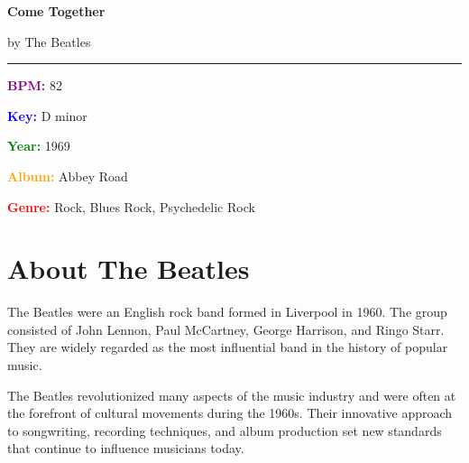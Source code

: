 \documentclass[11pt,letterpaper]{article}
\newcommand{\purple}[1]{\textcolor{purple}{\textbf{#1}}}
\newcommand{\bluepurple}[1]{\textcolor{blue}{\textbf{#1}}}
\newcommand{\greentext}[1]{\textcolor{green}{\textbf{#1}}}
\newcommand{\redtext}[1]{\textcolor{red}{\textbf{#1}}}
\newcommand{\orangetext}[1]{\textcolor{orange}{\textbf{#1}}}
\newcommand{\songtitle}{Come Together}
\newcommand{\artistname}{The Beatles}
\newcommand{\songbpm}{82}
\newcommand{\songkey}{D minor}
\newcommand{\songyear}{1969}
\newcommand{\songgenre}{Rock, Blues Rock, Psychedelic Rock}
\newcommand{\songalbum}{Abbey Road}
\begin{document}
\thispagestyle{empty}

\begin{center}
{\Huge\bfseries\sffamily \songtitle}

\vspace{0.3cm}

{\LARGE by \artistname}

\vspace{0.5cm}


\vspace{0.5cm}

\rule{0.8\textwidth}{0.5pt}
\end{center}

\vspace{0.5cm}

\begin{tcolorbox}[colback=lightgray,colframe=purple,width=\textwidth,arc=3mm,boxrule=1pt]
\begin{multicols}{2}
\textbf{\purple{BPM:}} \songbpm

\textbf{\bluepurple{Key:}} \songkey

\textbf{\greentext{Year:}} \songyear

\textbf{\orangetext{Album:}} \songalbum

\textbf{\redtext{Genre:}} \songgenre
\end{multicols}
\end{tcolorbox}

\vspace{0.5cm}

\section*{About The Beatles}

The Beatles were an English rock band formed in Liverpool in 1960. The group consisted of John Lennon, Paul McCartney, George Harrison, and Ringo Starr. They are widely regarded as the most influential band in the history of popular music.

The Beatles revolutionized many aspects of the music industry and were often at the forefront of cultural movements during the 1960s. Their innovative approach to songwriting, recording techniques, and album production set new standards that continue to influence musicians today.
\end{document}
